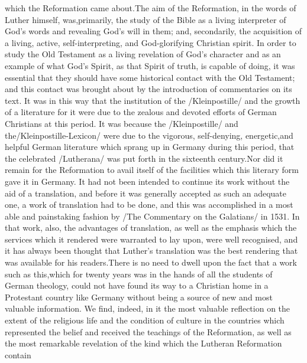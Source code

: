 \documentclass[a4paper]{article}
\begin{document}
which the Reformation came about.The aim of the Reformation, in the words of Luther himself, was,primarily, the study of the Bible as a living interpreter of God's words and revealing God's will in them; and, secondarily, the acquisition of a living, active, self-interpreting, and God-glorifying Christian spirit. In order to study the Old Testament as a living revelation of God's character and as an example of what God's Spirit, as that Spirit of truth, is capable of doing, it was essential that they should have some historical contact with the Old Testament; and this contact was brought about by the introduction of commentaries on its text. It was in this way that the institution of the /Kleinpostille/ and the growth of a literature for it were due to the zealous and devoted efforts of German Christians at this period. It was because the /Kleinpostille/ and the/Kleinpostille-Lexicon/ were due to the vigorous, self-denying, energetic,and helpful German literature which sprang up in Germany during this period, that the celebrated /Lutherana/ was put forth in the sixteenth century.Nor did it remain for the Reformation to avail itself of the facilities which this literary form gave it in Germany. It had not been intended to continue its work without the aid of a translation, and before it was generally accepted as such an adequate one, a work of translation had to be done, and this was accomplished in a most able and painstaking fashion by /The Commentary on the Galatians/ in 1531. In that work, also, the advantages of translation, as well as the emphasis which the services which it rendered were warranted to lay upon, were well recognised, and it has always been thought that Luther's translation was the best rendering that was available for his readers.There is no need to dwell upon the fact that a work such as this,which for twenty years was in the hands of all the students of German theology, could not have found its way to a Christian home in a Protestant country like Germany without being a source of new and most valuable information. We find, indeed, in it the most valuable reflection on the extent of the religious life and the condition of culture in the countries which represented the belief and received the teachings of the Reformation, as well as the most remarkable revelation of the kind which the Lutheran Reformation contain\\
\end{document}
